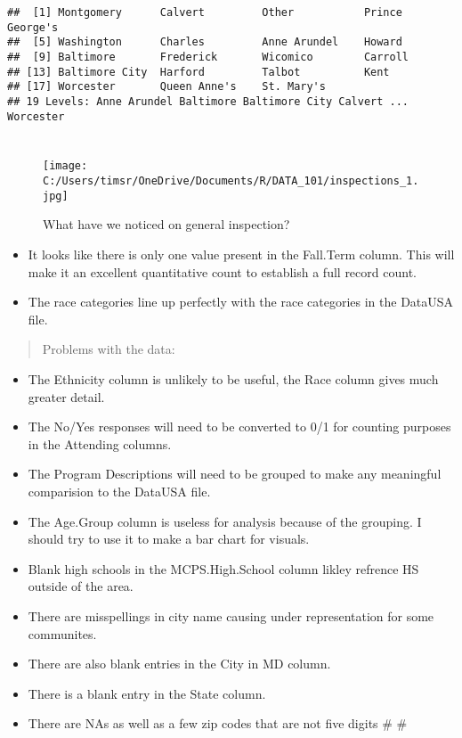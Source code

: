\documentclass[]{article}
\providecommand{\tightlist}{%
  \setlength{\itemsep}{0pt}\setlength{\parskip}{0pt}}
\begin{document}
\begin{verbatim}
##  [1] Montgomery      Calvert         Other           Prince George's
##  [5] Washington      Charles         Anne Arundel    Howard         
##  [9] Baltimore       Frederick       Wicomico        Carroll        
## [13] Baltimore City  Harford         Talbot          Kent           
## [17] Worcester       Queen Anne's    St. Mary's     
## 19 Levels: Anne Arundel Baltimore Baltimore City Calvert ... Worcester
\end{verbatim}

\section{}\label{section-1}

\section{}\label{section-2}

\begin{figure}
\centering
\texttt{[image: C:/Users/timsr/OneDrive/Documents/R/DATA\_101/inspections\_1.jpg]}
\caption{What have we noticed on general inspection?}
\end{figure}

\begin{itemize}
\tightlist
\item
  It looks like there is only one value present in the Fall.Term column.
  This will make it an excellent quantitative count to establish a full
  record count.
\item
  The race categories line up perfectly with the race categories in the
  DataUSA file.
\end{itemize}

\begin{quote}
Problems with the data:
\end{quote}

\begin{itemize}
\tightlist
\item
  The Ethnicity column is unlikely to be useful, the Race column gives
  much greater detail.
\item
  The No/Yes responses will need to be converted to 0/1 for counting
  purposes in the Attending columns.
\item
  The Program Descriptions will need to be grouped to make any
  meaningful comparision to the DataUSA file.
\item
  The Age.Group column is useless for analysis because of the grouping.
  I should try to use it to make a bar chart for visuals.
\item
  Blank high schools in the MCPS.High.School column likley refrence HS
  outside of the area.
\item
  There are misspellings in city name causing under representation for
  some communites.
\item
  There are also blank entries in the City in MD column.
\item
  There is a blank entry in the State column.
\item
  There are NAs as well as a few zip codes that are not five digits \#
  \#
\end{itemize}
\end{document}
